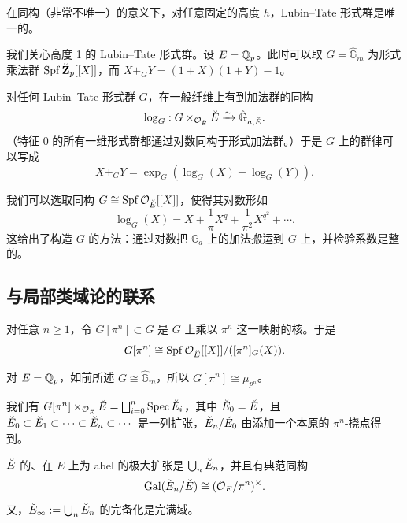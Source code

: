 \begin{theorem}
在同构（非常不唯一）的意义下，对任意固定的高度 $h$，Lubin–Tate 形式群是唯一的。
\end{theorem}

\begin{example}
我们关心高度 1 的 Lubin–Tate 形式群。设 $E = \mathbb{Q}_p$。此时可以取 $G = \hat{\mathbb G}_m$ 为形式乘法群 $\operatorname{Spf} \breve{\mathbf Z}_p[[X]]$，而 $X +_G Y = (1+X)(1+Y)-1$。
\end{example}

对任何 Lubin–Tate 形式群 $G$，在一般纤维上有到加法群的同构
\[
  \log_G: G \times_{\mathcal O_{\breve{E}}} \breve{E} \xrightarrow{\sim} \hat{\mathbb G}_{a,\breve{E}}.
\]
（特征 0 的所有一维形式群都通过对数同构于形式加法群。）于是 $G$ 上的群律可以写成
\[
  X +_G Y = \exp_G(\log_G(X) + \log_G(Y)).
\]


\begin{remark}
我们可以选取同构 $G \cong \operatorname{Spf} \mathcal O_{\breve{E}}[[X]]$，使得其对数形如
\[
  \log_G(X) = X + \frac{1}{\pi}X^q + \frac{1}{\pi^2}X^{q^2} + \cdots.
\]
这给出了构造 $G$ 的方法：通过对数把 $\mathbb G_a$ 上的加法搬运到 $G$ 上，并检验系数是整的。
\end{remark}

\subsection{与局部类域论的联系}

对任意 $n \ge 1$，令 $G[\pi^n] \subset G$ 是 $G$ 上乘以 $\pi^n$ 这一映射的核。于是
\[
  G[\pi^n] \cong \operatorname{Spf} \mathcal O_{\breve{E}}[[X]]/([\pi^n]_G(X)).
\]

\begin{example}
对 $E = \mathbb{Q}_p$，如前所述 $G \cong \hat{\mathbb G}_m$，所以 $G[\pi^n] \cong \mu_{p^n}$。

我们有 $G[\pi^n] \times_{\mathcal O_{\breve{E}}} \breve{E} = \bigsqcup_{i=0}^{n} \operatorname{Spec} \breve{E}_i$，其中 $\breve{E}_0 = \breve{E}$，且 $\breve{E}_0 \subset \breve{E}_1 \subset \cdots \subset \breve{E}_n \subset \cdots$ 是一列扩张，$\breve{E}_n/\breve{E}_0$ 由添加一个本原的 $\pi^n$-挠点得到。
\end{example}

\begin{theorem}
$\breve{E}$ 的、在 $E$ 上为 abel 的极大扩张是 $\bigcup_n \breve{E}_n$，并且有典范同构
\[
  \operatorname{Gal}(\breve{E}_n/\breve{E}) \cong (\mathcal O_E/\pi^n)^\times.
\]
又，$\breve{E}_\infty := \bigcup_n \breve{E}_n$ 的完备化是完满域。
\end{theorem}

